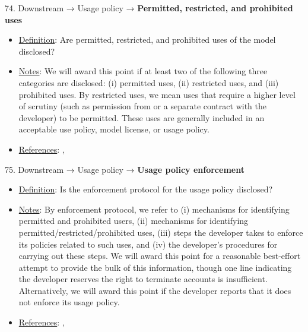74. Downstream → Usage policy → \textbf{Permitted, restricted, and prohibited uses}
\vspace{-\parskip}
\begin{itemize}
	\item
	\underline{Definition}: Are permitted, restricted, and prohibited uses of the model disclosed?
	\item
	\underline{Notes}: We will award this point if at least two of the following three categories are disclosed: (i) permitted uses, (ii) restricted uses, and (iii) prohibited uses. By restricted uses, we mean uses that require a higher level of scrutiny (such as permission from or a separate contract with the developer) to be permitted. These uses are generally included in an acceptable use policy, model license, or usage policy.
	\item
	\underline{References}: \citet{cohere2022}, \citet{meta2023}
\end{itemize} \vspace{\baselineskip}


75. Downstream → Usage policy → \textbf{Usage policy enforcement}
\vspace{-\parskip}
\begin{itemize}
	\item
	\underline{Definition}: Is the enforcement protocol for the usage policy disclosed?
	\item
	\underline{Notes}: By enforcement protocol, we refer to (i) mechanisms for identifying permitted and prohibited users, (ii) mechanisms for identifying permitted/restricted/prohibited uses, (iii) steps the developer takes to enforce its policies related to such uses, and (iv) the developer’s procedures for carrying out these steps. We will award this point for a reasonable best-effort attempt to provide the bulk of this information, though one line indicating the developer reserves the right to terminate accounts is insufficient. Alternatively, we will award this point if the developer reports that it does not enforce its usage policy.
	\item
	\underline{References}: \citet{cohere2022}, \citet{meta2023}
\end{itemize} \vspace{\baselineskip}


